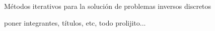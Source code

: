\documentclass[12pt, oneside]{book}
\begin{document}
	Métodos iterativos para la solución de problemas inversos discretos
	
	poner integrantes, títulos, etc, todo prolijito...
\end{document}
